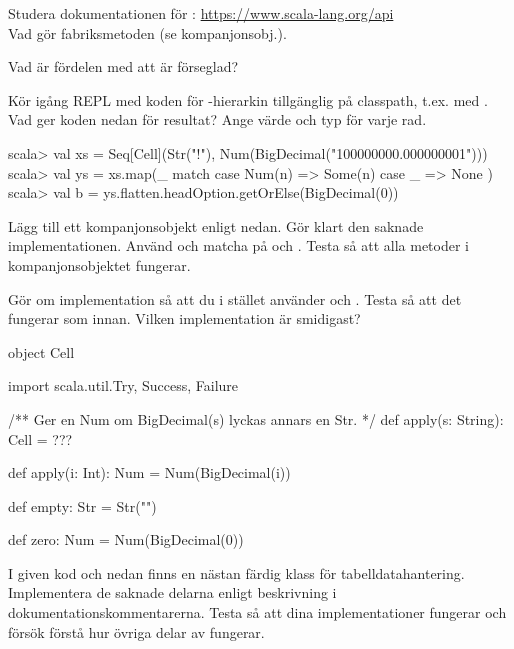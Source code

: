 \Subtask Studera dokumentationen för : \url{https://www.scala-lang.org/api}\\
Vad gör fabriksmetoden  (se kompanjonsobj.).


\Subtask Vad är fördelen med att  är förseglad?

\Subtask Kör igång REPL med koden för -hierarkin tillgänglig på classpath, t.ex. med . Vad ger koden nedan för resultat? Ange värde och typ för varje rad.

\begin{REPL}
scala> val xs = Seq[Cell](Str("!"), Num(BigDecimal("100000000.000000001")))
scala> val ys = xs.map(_ match { case Num(n) => Some(n) case _ => None })
scala> val b = ys.flatten.headOption.getOrElse(BigDecimal(0))
\end{REPL}

\Subtask Lägg till ett kompanjonsobjekt enligt nedan. Gör klart den saknade implementationen. Använd  och matcha på  och . Testa så att alla metoder i kompanjonsobjektet fungerar.

\Subtask Gör om implementation så att du i stället använder  och . Testa så att det fungerar som innan. Vilken implementation är smidigast?
\begin{CodeSmall}
object Cell {
  import scala.util.{Try, Success, Failure}

  /** Ger en Num om BigDecimal(s) lyckas annars en Str. */
  def apply(s: String): Cell =  ???

  def apply(i: Int): Num = Num(BigDecimal(i))

  def empty: Str = Str("")

  def zero: Num = Num(BigDecimal(0))
}
\end{CodeSmall}

\Subtask I given kod och nedan finns en nästan färdig klass för tabelldatahantering. Implementera de saknade delarna enligt beskrivning i dokumentationskommentarerna. Testa så att dina implementationer fungerar och försök förstå hur övriga delar av  fungerar.


